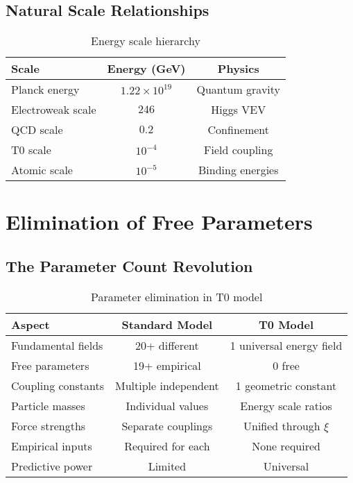 \documentclass[12pt,a4paper]{report}
\begin{document}
\subsection{Natural Scale Relationships}
\label{subsec:natural_scale_relationships}

\begin{table}[htbp]
	\centering
	\begin{tabular}{lcc}
		\toprule
		\textbf{Scale} & \textbf{Energy (GeV)} & \textbf{Physics} \\
		\midrule
		Planck energy & $1.22 \times 10^{19}$ & Quantum gravity \\
		Electroweak scale & $246$ & Higgs VEV \\
		QCD scale & $0.2$ & Confinement \\
		T0 scale & $10^{-4}$ & Field coupling \\
		Atomic scale & $10^{-5}$ & Binding energies \\
		\bottomrule
	\end{tabular}
	\caption{Energy scale hierarchy}
	\label{tab:energy_scales_no_xi}
\end{table}

\section{Elimination of Free Parameters}
\label{sec:elimination_free_parameters}

\subsection{The Parameter Count Revolution}
\label{subsec:parameter_count_revolution}

\begin{table}[htbp]
	\centering
	\begin{tabular}{lcc}
		\toprule
		\textbf{Aspect} & \textbf{Standard Model} & \textbf{T0 Model} \\
		\midrule
		Fundamental fields & 20+ different & 1 universal energy field \\
		Free parameters & 19+ empirical & 0 free \\
		Coupling constants & Multiple independent & 1 geometric constant \\
		Particle masses & Individual values & Energy scale ratios \\
		Force strengths & Separate couplings & Unified through $\xi$ \\
		Empirical inputs & Required for each & None required \\
		Predictive power & Limited & Universal \\
		\bottomrule
	\end{tabular}
	\caption{Parameter elimination in T0 model}
	\label{tab:parameter_elimination}
\end{table}
\end{document}

